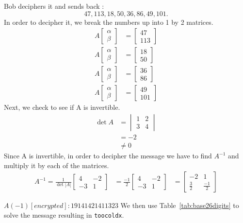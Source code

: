 \begin{example} Bob deciphers it and sends back : \[47, 113, 18, 50, 36, 86, 49, 101.\]
In order to decipher it, we break the numbers up into 1 by 2 matrices.
 \begin{align*} 
 A
 \begin{bmatrix}
    \alpha \\
    \beta 
\end{bmatrix} &= 
\begin{bmatrix}
    47 \\
    113
\end{bmatrix}\\
A
 \begin{bmatrix}
    \alpha \\
    \beta 
\end{bmatrix} &= 
\begin{bmatrix}
    18\\
    50
\end{bmatrix}\\
A
 \begin{bmatrix}
    \alpha \\
    \beta  
\end{bmatrix} &= 
\begin{bmatrix}
    36 \\
    86
\end{bmatrix}\\
A
 \begin{bmatrix}
    \alpha \\
    \beta 
\end{bmatrix} &= 
\begin{bmatrix}
    49 \\
    101
\end{bmatrix}
\end{align*}
Next, we check to see if A is invertible.
\begin{align*}
\det A &=
\begin{vmatrix}
1 & 2 \\ 
3 & 4
\end{vmatrix}\\
&= -2 \\
&\neq 0
\end{align*}
Since A is invertible, in order to decipher the message we have to find $A^{-1}$ and multiply it by each of the matrices.
\begin{align*}
A^{-1} = \frac{1}{\det |A|}
\begin{bmatrix}
    4 & -2 \\
    -3 & 1
\end{bmatrix}
&= \frac{-1}{2}
\begin{bmatrix}
    4 & -2 \\
    -3 & 1
\end{bmatrix}
&= 
\begin{bmatrix}
    -2 & 1 \\
    \frac{3}{2} & \frac{-1}{2}
\end{bmatrix}
\end{align*}

$A(-1)[encrypted] : 19 14 14 2 14 11 3 23$
We then use Table~\ref{tab:base26digits} to solve the message resulting in {\tt toocoldx}. 
\end{example}

